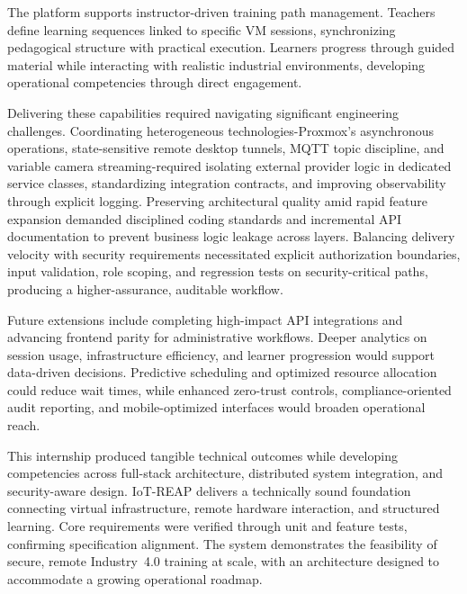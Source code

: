 The platform supports instructor-driven training path management. Teachers define learning
sequences linked to specific VM sessions, synchronizing pedagogical structure with practical
execution. Learners progress through guided material while interacting with realistic
industrial environments, developing operational competencies through direct engagement.

Delivering these capabilities required navigating significant engineering challenges.
Coordinating heterogeneous technologies-Proxmox's asynchronous operations, state-sensitive
remote desktop tunnels, MQTT topic discipline, and variable camera streaming-required
isolating external provider logic in dedicated service classes, standardizing integration
contracts, and improving observability through explicit logging. Preserving architectural
quality amid rapid feature expansion demanded disciplined coding standards and incremental
API documentation to prevent business logic leakage across layers. Balancing delivery velocity
with security requirements necessitated explicit authorization boundaries, input validation,
role scoping, and regression tests on security-critical paths, producing a higher-assurance,
auditable workflow.

Future extensions include completing high-impact API integrations and advancing frontend
parity for administrative workflows. Deeper analytics on session usage, infrastructure
efficiency, and learner progression would support data-driven decisions. Predictive scheduling
and optimized resource allocation could reduce wait times, while enhanced zero-trust controls,
compliance-oriented audit reporting, and mobile-optimized interfaces would broaden operational
reach.

This internship produced tangible technical outcomes while developing competencies across
full-stack architecture, distributed system integration, and security-aware design. IoT-REAP
delivers a technically sound foundation connecting virtual infrastructure, remote hardware
interaction, and structured learning. Core requirements were verified through unit and feature
tests, confirming specification alignment. The system demonstrates the feasibility of secure,
remote Industry~4.0 training at scale, with an architecture designed to accommodate a growing
operational roadmap.

\cleardoublepage